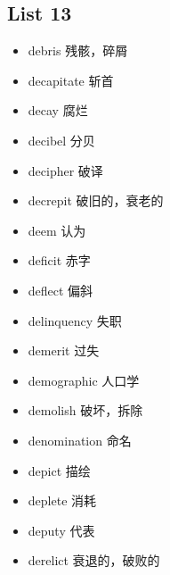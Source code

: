 \documentclass[a4paper,10pt]{article}
\begin{document}
\begin{CJK*}{UTF8}{gkai}
\section{List 13}
\begin{itemize}
\item debris 残骸，碎屑 
\hspace{1cm}
\item decapitate 斩首
\hspace{1cm}
\item decay 腐烂
\hspace{1cm}
\item decibel 分贝
\hspace{1cm}
\item decipher 破译
\hspace{1cm}
\item decrepit 破旧的，衰老的
\hspace{1cm}
\item deem 认为
\hspace{1cm}
\item deficit 赤字
\hspace{1cm}
\item deflect 偏斜
\hspace{1cm}
\item delinquency 失职
\hspace{1cm}
\item demerit 过失
\hspace{1cm}
\item demographic 人口学
\hspace{1cm}
\item demolish 破坏，拆除
\hspace{1cm}
\item denomination 命名
\hspace{1cm}
\item depict 描绘
\hspace{1cm}
\item deplete 消耗
\hspace{1cm}
\item deputy 代表
\hspace{1cm}
\item derelict 衰退的，破败的
\hspace{1cm}
\end{itemize}

\newpage

\end{CJK*}
\end{document}
